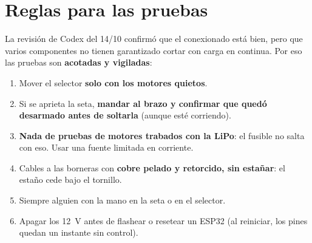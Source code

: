 \section{Reglas para las pruebas}

La revisión de Codex del 14/10 confirmó que el conexionado está bien, pero que varios componentes no tienen
garantizado cortar con carga en continua. Por eso las pruebas son \textbf{acotadas y vigiladas}:

\begin{enumerate}
  \item Mover el selector \textbf{solo con los motores quietos}.
  \item Si se aprieta la seta, \textbf{mandar  al brazo y confirmar que quedó desarmado antes de
        soltarla} (aunque  esté corriendo).
  \item \textbf{Nada de pruebas de motores trabados con la LiPo}: el fusible no salta con eso. Usar una fuente
        limitada en corriente.
  \item Cables a las borneras con \textbf{cobre pelado y retorcido, sin estañar}: el estaño cede bajo el tornillo.
  \item Siempre alguien con la mano en la seta o en el selector.
  \item Apagar los 12~V antes de flashear o resetear un ESP32 (al reiniciar, los pines quedan un instante sin
        control).
\end{enumerate}
